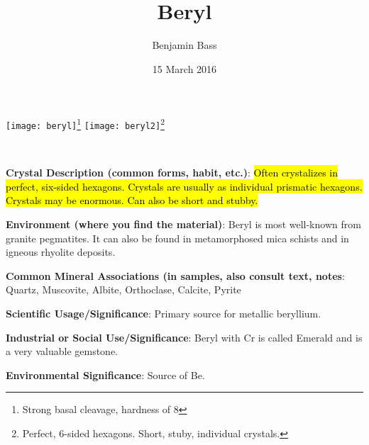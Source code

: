 \documentclass[10pt]{article}
\author{Benjamin Bass}
\date{15 March 2016}
\title{\vspace{-2.0cm} Beryl} %
\begin{document}
\maketitle


\begin{center}
  \texttt{[image: beryl]}\footnote{Strong basal cleavage, hardness of 8}
  \texttt{[image: beryl2]}\footnote{Perfect, 6-sided hexagons. Short, stuby, individual crystals.}
\end{center}



\
\
\
\
\
\
\
\
\
\

\begin{framed}
  \textbf{Crystal Description (common forms, habit, etc.)}: \hl{Often crystalizes in perfect, six-sided hexagons. Crystals are usually as individual prismatic hexagons. Crystals may be enormous. Can also be short and stubby.}
\end{framed}

\begin{framed}
  \textbf{Environment (where you find the material)}: Beryl is most well-known from granite pegmatites. It can also be found in metamorphosed mica schists and in igneous rhyolite deposits.
\end{framed}

\begin{framed}
  \textbf{Common Mineral Associations (in samples, also consult text, notes}: Quartz, Muscovite, Albite, Orthoclase, Calcite, Pyrite
\end{framed}

\begin{framed}
  \textbf{Scientific Usage/Significance}: Primary source for metallic beryllium. 
\end{framed}

\begin{framed}
  \textbf{Industrial or Social Use/Significance}: Beryl with Cr is called Emerald and is a very valuable gemstone.
\end{framed}

\begin{framed}
  \textbf{Environmental Significance}: Source of Be.
\end{framed}

\end{document}
